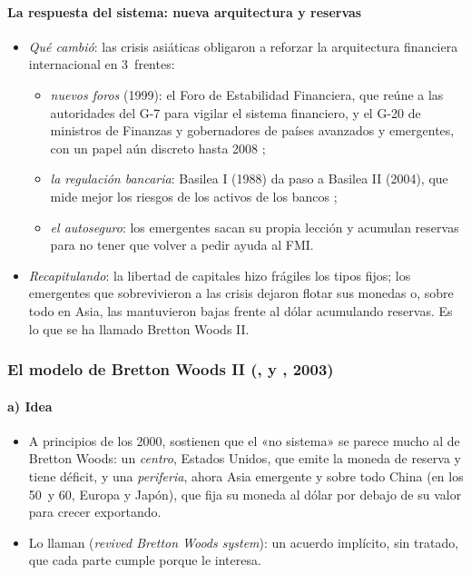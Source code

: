 \documentclass[11pt]{article}
\begin{document}
\paragraph{La respuesta del sistema: nueva arquitectura y reservas}

\begin{itemize}
\item \emph{Qué cambió}: las crisis asiáticas obligaron a reforzar la arquitectura financiera internacional en 3~frentes:
  \begin{itemize}
  \item \emph{nuevos foros} (1999): el Foro de Estabilidad Financiera, que reúne a las autoridades del G-7 para vigilar el sistema financiero, y el G-20 de ministros de Finanzas y gobernadores de países avanzados y emergentes, con un papel aún discreto hasta 2008\nocite{G201999Berlin} ;
  \item \emph{la regulación bancaria}: Basilea I (1988) da paso a Basilea II (2004), que mide mejor los riesgos de los activos de los bancos ;
  \item \emph{el autoseguro}: los emergentes sacan su propia lección y acumulan reservas para no tener que volver a pedir ayuda al FMI.
  \end{itemize}
\item \emph{Recapitulando}: la libertad de capitales hizo frágiles los tipos fijos; los emergentes que sobrevivieron a las crisis dejaron flotar sus monedas o, sobre todo en Asia, las mantuvieron bajas frente al dólar acumulando reservas. Es lo que se ha llamado Bretton Woods II.
\end{itemize}

\subsubsection{El modelo de Bretton Woods II (,  y , 2003)}\label{sec:bw2}

\paragraph{a) Idea}

\begin{itemize}
\item A principios de los 2000, \textcite{DooleyFolkertsLandauGarber2003} sostienen que el «no sistema» se parece mucho al de Bretton Woods: un \emph{centro}, Estados Unidos, que emite la moneda de reserva y tiene déficit, y una \emph{periferia}, ahora Asia emergente y sobre todo China (en los 50~y 60, Europa y Japón), que fija su moneda al dólar por debajo de su valor para crecer exportando.
\item Lo llaman  (\emph{revived Bretton Woods system}): un acuerdo implícito, sin tratado, que cada parte cumple porque le interesa.
\end{itemize}
\end{document}

